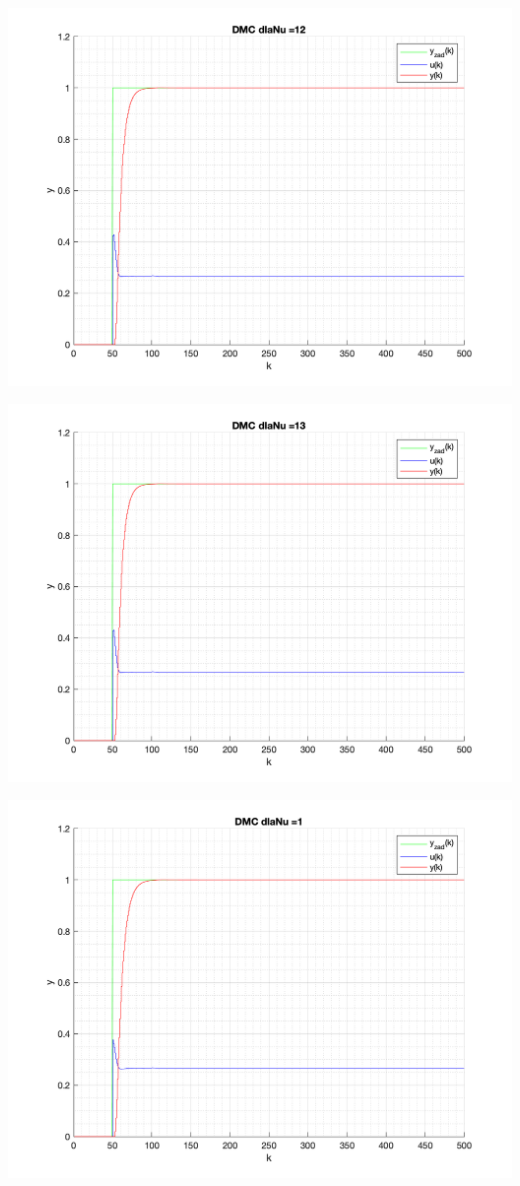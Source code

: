 \documentclass[a4paper, 11pt]{article}
\begin{document}
\begin{enumerate}
 \includegraphics[width=\linewidth]{./ModelsP4_Nu/P4_DMC_Nu_12_png.png} 
 
 \includegraphics[width=\linewidth]{./ModelsP4_Nu/P4_DMC_Nu_13_png.png} 
 
 \includegraphics[width=\linewidth]{./ModelsP4_Nu/P4_DMC_Nu_1_png.png} 
 

\end{enumerate}
\end{document}
